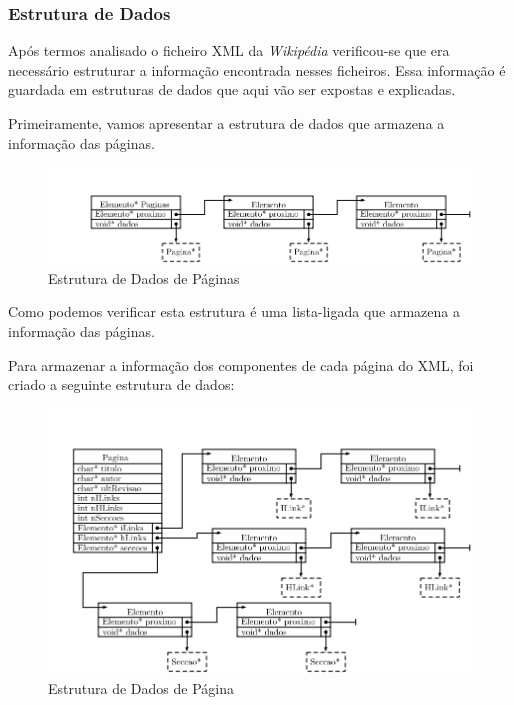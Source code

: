 \documentclass[11pt, a4paper, oneside]{article}
\begin{document}
\subsubsection{Estrutura de Dados}

Após termos analisado o ficheiro XML da \textit{Wikipédia} verificou-se que era necessário estruturar a informação encontrada nesses ficheiros. Essa informação é guardada em estruturas de dados que aqui vão ser expostas e explicadas. 

Primeiramente, vamos apresentar a estrutura de dados que armazena a informação das páginas.
\begin{figure}[h]
\begin{center}
\includegraphics[width=0.9\linewidth]{paginas}
\caption{Estrutura de Dados de Páginas}
\end{center}
\end{figure}


Como podemos verificar esta estrutura é uma lista-ligada que armazena a informação das páginas.


Para armazenar a informação dos componentes de cada página do XML, foi criado a seguinte estrutura de dados: \\
\begin{figure}[h]
\begin{center}
\includegraphics[width=0.9\linewidth]{pagina}
\caption{Estrutura de Dados de Página}
\end{center}
\end{figure}
\end{document}
